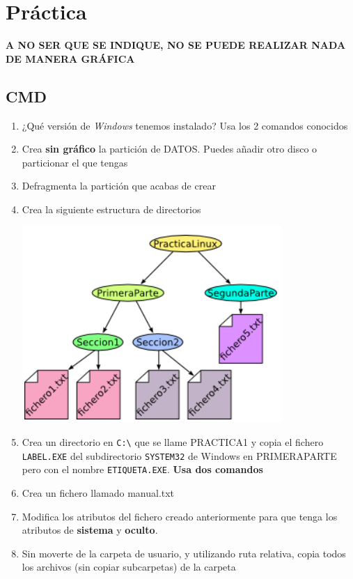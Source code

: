 \documentclass[11pt]{article}
\begin{document}
\section{Práctica}
\label{sec:org9c652bd}
\textbf{A NO SER QUE SE INDIQUE, NO SE PUEDE REALIZAR NADA DE MANERA GRÁFICA}
\subsection{CMD}
\label{sec:org465626f}
\begin{enumerate}
\item ¿Qué versión de \emph{Windows} tenemos instalado? Usa los 2 comandos conocidos
\item Crea \textbf{sin gráfico} la partición de DATOS. Puedes añadir otro disco o particionar el que tengas
\item Defragmenta la partición que acabas de crear
\item Crea la siguiente estructura de directorios
\begin{center}
\includegraphics[width=.9\linewidth]{../tipo-examen/img/1.png}
\end{center}
\item Crea un directorio en \texttt{C:\textbackslash{}} que se llame PRACTICA1 y copia el fichero \texttt{LABEL.EXE} del subdirectorio \texttt{SYSTEM32} de Windows en
PRIMERAPARTE pero con el nombre \texttt{ETIQUETA.EXE}. \textbf{Usa dos comandos}
\item Crea un fichero llamado manual.txt
\item Modifica los atributos del fichero creado anteriormente para que tenga los atributos de \textbf{sistema} y \textbf{oculto}.
\item Sin moverte de la carpeta de usuario, y utilizando ruta relativa, copia todos los archivos (sin copiar subcarpetas) de la carpeta

\end{enumerate}
\end{document}

